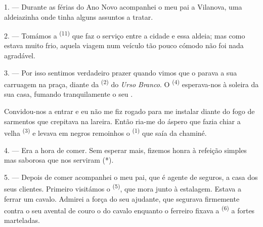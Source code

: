 %


\VUsaut{4.0mm}
\VUsaut{3.0mm}
\VUfilet{16mm}
\VUsaut{5.6mm}
\VUsaut{3.0mm}

\VUsaut{3.0mm}

\VUsaut{4.0mm}

1. --- Durante as férias do Ano Novo acompanhei o meu pai a Vilanova, uma
aldeiazinha onde tinha alguns assuntos a tratar.

2. --- Tomámos a  \textsuperscript{(11)} que faz o serviço
entre a cidade e essa aldeia; mas como estava muito frio, aquela viagem
num veículo tão pouco cómodo não foi nada agradável.

3. --- Por isso sentimos verdadeiro prazer quando vimos que o
 parava a sua carruagem na praça, diante da
 \textsuperscript{(2)} do \textit{Urso Branco}. O
 \textsuperscript{(4)} esperava-nos à soleira da sua casa,
fumando tranquilamente o seu .

Convidou-nos a entrar e eu não me fiz rogado para me instalar diante do
fogo de sarmentos que crepitava na lareira. Então ria-me do áspero
 que fazia chiar a velha 
\textsuperscript{(3)} e levava em negros remoinhos o 
\textsuperscript{(1)} que saía da chaminé.

4. --- Era a hora de comer. Sem esperar mais, fizemos honra à refeição
simples mas saborosa que nos serviram (*).

\VUsaut{3.0mm}

5. --- Depois de comer acompanhei o meu pai, que é agente de seguros, a
casa dos seus clientes. Primeiro visitámos o 
\textsuperscript{(5)}, que mora junto à estalagem. Estava a ferrar um cavalo.
Admirei a força do seu ajudante, que segurava firmemente contra o seu
avental de couro o  do cavalo enquanto o ferreiro fixava a
 \textsuperscript{(6)} a fortes marteladas.

